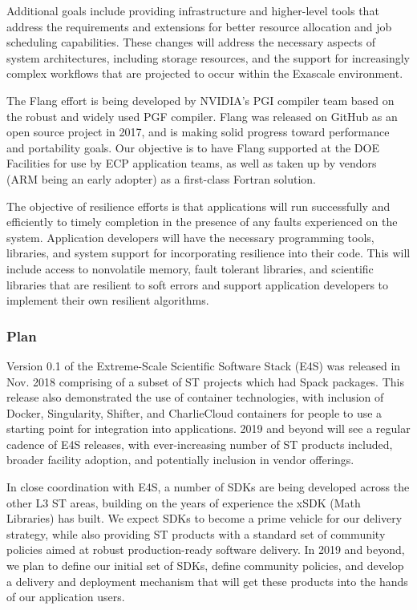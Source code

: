 Additional goals include providing infrastructure and higher-level tools that address the requirements and extensions for better resource allocation and job scheduling capabilities. These changes will address the necessary aspects of system architectures, including storage resources, and the support for increasingly complex workflows that are projected to occur within the Exascale environment. 

The Flang effort is being developed by NVIDIA's PGI compiler team based on the robust and widely used PGF compiler. Flang was released on GitHub as an open source project in 2017, and is making solid progress toward performance and portability goals. Our objective is to have Flang supported at the DOE Facilities for use by ECP application teams, as well as taken up by vendors (ARM being an early adopter) as a first-class Fortran solution.

The objective of resilience efforts is that applications will run successfully and efficiently to timely completion in the presence of any faults experienced on the system. Application developers will have the necessary programming tools, libraries, and system support for incorporating resilience into their code. This will include access to nonvolatile memory, fault tolerant libraries, and scientific libraries that are resilient to soft errors and support application developers to implement their own resilient algorithms.

\subsubsection{Plan}
Version 0.1 of the Extreme-Scale Scientific Software Stack (E4S) was released in Nov. 2018 comprising of a subset of ST projects which had Spack packages. This release also demonstrated the use of container technologies, with inclusion of Docker, Singularity, Shifter, and CharlieCloud containers for people to use a starting point for integration into applications. 2019 and beyond will see a regular cadence of E4S releases, with ever-increasing number of ST products included, broader facility adoption, and potentially inclusion in vendor offerings.

In close coordination with E4S, a number of SDKs are being developed across the other L3 ST areas, building on the years of experience the xSDK (Math Libraries) has built. We expect SDKs to become a prime vehicle for our delivery strategy, while also providing ST products with a standard set of community policies aimed at robust production-ready software delivery. In 2019 and beyond, we plan to define our initial set of SDKs, define community policies, and develop a delivery and deployment mechanism that will get these products into the hands of our application users.

